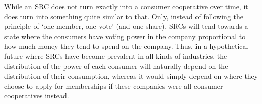 \documentclass{article}
\begin{document}
While an SRC does not turn exactly into a consumer cooperative over time, it does turn into something quite similar to that. Only, instead of following the principle of `one member, one vote' (and one share), SRCs will tend towards a state where the consumers have voting power in the company proportional to how much money they tend to spend on the company. %
%
Thus, in a hypothetical future where SRCs have become prevalent in all kinds of industries, the distribution of the power of each consumer will naturally depend on the distribution of their consumption, whereas it would simply depend on where they choose to apply for %
memberships if these companies were all consumer cooperatives instead.










%
\end{document}
